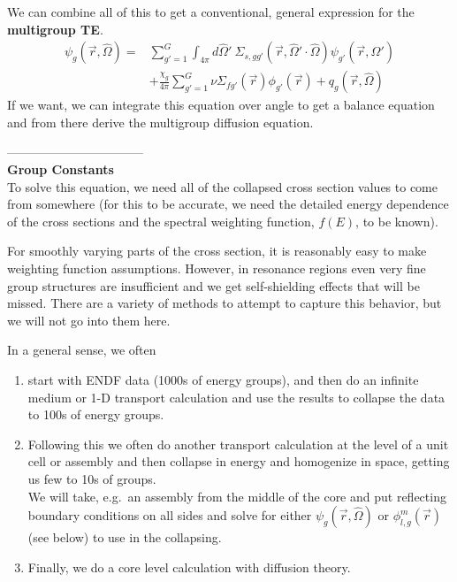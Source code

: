 \documentclass[12pt]{article}
\newcommand{\vecr}{\ensuremath{\vec{r}}}
\newcommand{\vOmega}{\ensuremath{\hat{\Omega}}}
\begin{document}
%
We can combine all of this to get a conventional, general expression for the \textbf{multigroup TE}.
\begin{align*}
[\vOmega \cdot \nabla + \Sigma_{tg}(\vec{r})]\psi_g(\vec{r}, \vOmega) =&  \sum_{g'=1}^G \int_{4 \pi} d\vOmega'\: \Sigma_{s,gg'}(\vecr, \vOmega' \cdot \vOmega) \psi_{g'}(\vec{r}, \vOmega')\\
&+\frac{\chi_g}{4 \pi}\sum_{g'=1}^G \nu\Sigma_{fg'}(\vec{r}) \phi_{g'}(\vec{r}) + q_g(\vec{r}, \vOmega)
\end{align*}
If we want, we can integrate this equation over angle to get a balance equation and from there derive the multigroup diffusion equation.

---------------------------------\\
\textbf{Group Constants}\\
To solve this equation, we need all of the collapsed cross section values to come from somewhere (for this to be accurate, we need the detailed energy dependence of the cross sections and the spectral weighting function, $f(E)$, to be known). 

For smoothly varying parts of the cross section, it is reasonably easy to make weighting function assumptions. However, in resonance regions even very fine group structures are insufficient and we get self-shielding effects that will be missed. There are a variety of methods to attempt to capture this behavior, but we will not go into them here.

In a general sense, we often 
\begin{enumerate}
\item start with ENDF data (1000s of energy groups), and then do an infinite medium or 1-D transport calculation and use the results to collapse the data to 100s of energy groups.

\item Following this we often do another transport calculation at the level of a unit cell or assembly and then collapse in energy and homogenize in space, getting us few to 10s of groups.\\
We will take, e.g.\ an assembly from the middle of the core and put reflecting boundary conditions on all sides and solve for either $\psi_g(\vec{r}, \vOmega)$ or $\phi_{l,g}^m(\vec{r})$ (see below) to use in the collapsing.

\item Finally, we do a core level calculation with diffusion theory. 
\end{enumerate}
\end{document}
